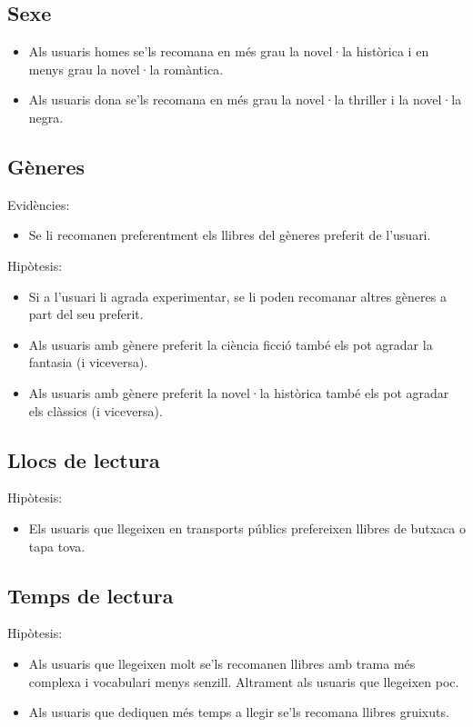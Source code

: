 \subsection{Sexe}
\begin{itemize}
  \item Als usuaris homes se'ls recomana en més grau la novel·la històrica i en menys grau la novel·la romàntica.
  \item Als usuaris dona se'ls recomana en més grau la novel·la thriller i la novel·la negra.
\end{itemize}

\subsection{Gèneres}
Evidències:
\begin{itemize}
  \item Se li recomanen preferentment els llibres del gèneres preferit de l'usuari.  
\end{itemize}
Hipòtesis:
\begin{itemize}
  \item Si a l'usuari li agrada experimentar, se li poden recomanar altres gèneres a part del seu preferit.  
  \item Als usuaris amb gènere preferit la ciència ficció també els pot agradar la fantasia (i viceversa).
  \item Als usuaris amb gènere preferit la novel·la històrica també els pot agradar els clàssics (i viceversa).
\end{itemize}

\subsection{Llocs de lectura}
Hipòtesis:
\begin{itemize}
  \item Els usuaris que llegeixen en transports públics prefereixen llibres de butxaca o tapa tova.
\end{itemize}

\subsection{Temps de lectura}
Hipòtesis:
\begin{itemize}
  \item Als usuaris que llegeixen molt se'ls recomanen llibres amb trama més complexa i vocabulari menys senzill. Altrament als usuaris que llegeixen poc.
  \item Als usuaris que dediquen més temps a llegir se'ls recomana llibres gruixuts.
\end{itemize}

